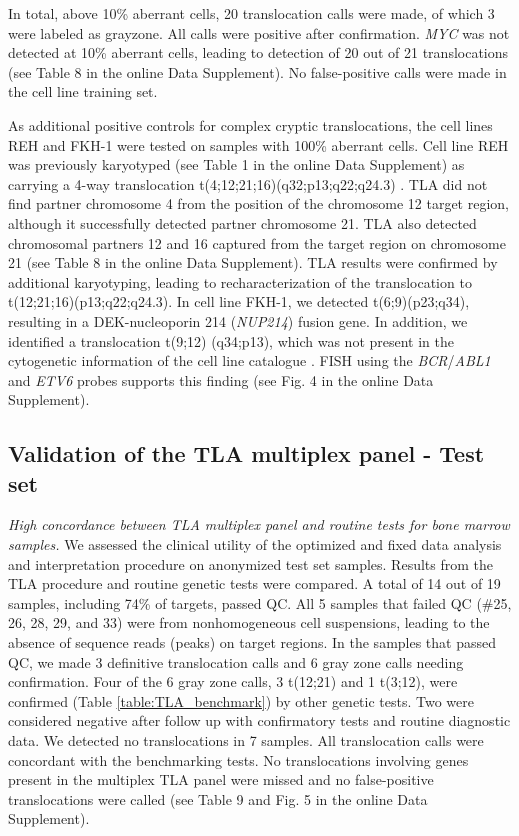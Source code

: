In total, above 10\% aberrant cells, 20 translocation calls were made, of which 3 were labeled as grayzone. 
All calls were positive after confirmation. 
\textsl{MYC} was not detected at 10\% aberrant cells, leading to detection of 20 out of 21 translocations (see Table 8 in the online Data Supplement). 
No false-positive calls were made in the cell line training set.

As additional positive controls for complex cryptic translocations, the cell lines REH and FKH-1 were tested on samples with 100\% aberrant cells. 
Cell line REH was previously karyotyped (see Table 1 in the online Data Supplement) as carrying a 4-way translocation t(4;12;21;16)(q32;p13;q22;q24.3) \cite{Leibniz_REH_2017}.
TLA did not find partner chromosome 4 from the position of the chromosome 12 target region, although it successfully detected partner chromosome 21. 
TLA also detected chromosomal partners 12 and 16 captured from the target region on chromosome 21 (see Table 8 in the online Data Supplement). 
TLA results were confirmed by additional karyotyping, leading to recharacterization of the translocation to t(12;21;16)(p13;q22;q24.3). 
In cell line FKH-1, we detected t(6;9)(p23;q34), resulting in a DEK-nucleoporin 214 (\textsl{NUP214}) fusion gene. 
In addition, we identified a translocation t(9;12) (q34;p13), which was not present in the cytogenetic information of the cell line catalogue \cite{Leibniz_FKH1_2017}. 
FISH using the \textsl{BCR}/\textsl{ABL1} and \textsl{ETV6} probes supports this finding (see Fig. 4 in the online Data Supplement).

\subsection{Validation of the TLA multiplex panel - Test set}
\textsl{High concordance between TLA multiplex panel and routine tests for bone marrow samples. }
We assessed the clinical utility of the optimized and fixed data analysis and interpretation procedure on anonymized test set samples.
Results from the TLA procedure and routine genetic tests were compared. 
A total of 14 out of 19 samples, including 74\% of targets, passed QC. 
All 5 samples that failed QC (\#25, 26, 28, 29, and 33) were from nonhomogeneous cell suspensions, leading to the absence of sequence reads (peaks) on target regions. 
In the samples that passed QC, we made 3 definitive translocation calls and 6 gray zone calls needing confirmation. 
Four of the 6 gray zone calls, 3 t(12;21) and 1 t(3;12), were confirmed (Table \ref{table:TLA_benchmark}) by other genetic tests. 
Two were considered negative after follow up with confirmatory tests and routine diagnostic data. 
We detected no translocations in 7 samples. 
All translocation calls were concordant with the benchmarking tests. 
No translocations involving genes present in the multiplex TLA panel were missed and no false-positive translocations were called (see Table 9 and Fig. 5 in the online Data Supplement).

